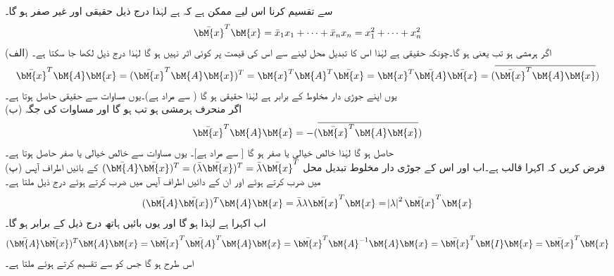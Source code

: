  سے تقسیم کرنا اس لیے ممکن ہے کہ  ہے لہٰذا درج ذیل حقیقی اور غیر صفر ہو گا۔
\begin{align*}
\bar{\bM{x}}^T\bM{x}=\bar{x}_1x_1+\cdots+\bar{x}_nx_n=x_1^2+\cdots+x_n^2
\end{align*}
(الف) اگر  ہرمشی ہو تب  یعنی  ہو گا۔چونکہ  حقیقی ہے لہٰذا اس کا تبدیل محل لینے سے اس کی قیمت پر کوئی اثر نہیں ہو گا لہٰذا درج ذیل لکھا جا سکتا ہے۔
\begin{align}\label{مساوات_امتیازی_مسئلہ_اقدار_ب}
\bar{\bM{x}}^T\bM{A}\bM{x}=(\bar{\bM{x}}^T\bM{A}\bM{x})^T=\bM{x}^T\bM{A}^T\bar{\bM{x}}=\bM{x}^T\bar{\bM{A}}\bar{\bM{x}}=(\overline{\bar{\bM{x}}^T\bM{A}\bM{x}})
\end{align} 
یوں  اپنے جوڑی دار مخلوط کے برابر ہے لہٰذا  حقیقی ہو گا ( سے مراد  ہے)۔یوں مساوات  سے  حقیقی حاصل ہوتا ہے۔\\
(ب) اگر  منحرف ہرمشی ہو تب  ہو گا اور مساوات  کی جگہ
\begin{align}\label{مساوات_امتیازی_مسئلہ_اقدار_پ}
\bar{\bM{x}}^T\bM{A}\bM{x}=-(\overline{\bar{\bM{x}}^T\bM{A}\bM{x}})
\end{align}
حاصل ہو گا لہٰذا  خالص خیالی یا صفر  ہو گا [ سے مراد  ہے]۔ یوں مساوات  سے  خالص خیالی یا صفر  حاصل ہوتا ہے۔\\
(پ) فرض کریں کہ  اکہرا  قالب ہے۔اب  اور اس کے جوڑی دار مخلوط تبدیل محل 
$(\bar{\bM{A}}\bar{\bM{x}})^T=(\bar{\lambda}\bar{\bM{x}})^T=\bar{\lambda}\bar{\bM{x}}^T$
کے بائیں اطراف آپس میں ضرب کرتے ہوئے اور ان کے دائیں اطراف آپس میں ضرب کرتے ہوئے درج ذیل ملتا ہے۔
\begin{align*}
(\bar{\bM{A}}\bar{\bM{x}})^T\bM{A}\bM{x}=\bar{\lambda}\lambda\bar{\bM{x}}^T\bM{x}=\abs{\lambda}^2\bar{\bM{x}}^T\bM{x}
\end{align*}
اب  اکہرا ہے لہٰذا  ہو گا اور یوں بائیں ہاتھ درج ذیل کے برابر ہو گا۔
\begin{align*}
(\bar{\bM{A}}\bar{\bM{x}})^T\bM{A}\bM{x}=\bar{\bM{x}}^T\bar{\bM{A}}^T\bM{A}\bM{x}=\bar{\bM{x}}^T\bM{A}^{-1}\bM{A}\bM{x}=\bar{\bM{x}}^T\bM{I}\bM{x}=\bar{\bM{x}}^T\bM{x}
\end{align*}
اس طرح  ہو گا جس کو  سے تقسیم کرتے ہوئے  ملتا ہے۔

